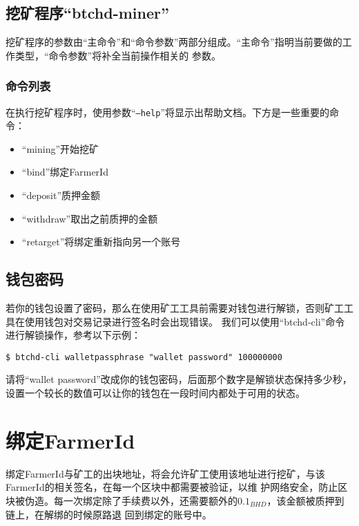 \begin{flushleft}
\subsection{挖矿程序``btchd-miner''}
\begin{flushleft}
    挖矿程序的参数由``主命令''和``命令参数''两部分组成。``主命令''指明当前要做的工作类型，``命令参数''将补全当前操作相关的
    参数。
\end{flushleft}
\subsubsection{命令列表}
\begin{flushleft}
    在执行挖矿程序时，使用参数``\texttt{--help}''将显示出帮助文档。下方是一些重要的命令：
\end{flushleft}
\begin{itemize}
    \item ``mining''开始挖矿
    \item ``bind''绑定FarmerId
    \item ``deposit''质押金额
    \item ``withdraw''取出之前质押的金额
    \item ``retarget''将绑定重新指向另一个账号
\end{itemize}
\subsection{钱包密码}
\begin{flushleft}
    若你的钱包设置了密码，那么在使用矿工工具前需要对钱包进行解锁，否则矿工工具在使用钱包对交易记录进行签名时会出现错误。
    我们可以使用``btchd-cli''命令进行解锁操作，参考以下示例：
\end{flushleft}
\scriptsize
\begin{verbatim}
$ btchd-cli walletpassphrase "wallet password" 100000000
\end{verbatim}
\normalsize
\begin{flushleft}
    请将``wallet password''改成你的钱包密码，后面那个数字是解锁状态保持多少秒，
    设置一个较长的数值可以让你的钱包在一段时间内都处于可用的状态。
\end{flushleft}
\section{绑定FarmerId}
\begin{flushleft}
    绑定FarmerId与矿工的出块地址，将会允许矿工使用该地址进行挖矿，与该FarmerId的相关签名，在每一个区块中都需要被验证，以维
    护网络安全，防止区块被伪造。每一次绑定除了手续费以外，还需要额外的$0.1_{BHD}$，该金额被质押到链上，在解绑的时候原路退
    回到绑定的账号中。
\end{flushleft}

\end{flushleft}
